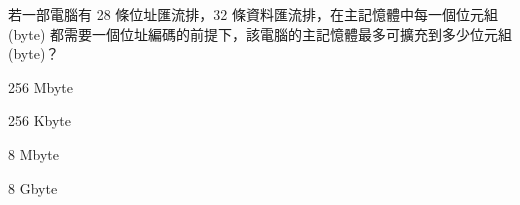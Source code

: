 \ifx\ntpcNinetyThree\undefined[93學年基北區] \fi
若一部電腦有 28 條位址匯流排，32 條資料匯流排，在主記憶體中每一個位元組 (byte) 都需要一個位址編碼的前提下，該電腦的主記憶體最多可擴充到多少位元組 (byte)？
  \begin{optionlist}
  \item 256 Mbyte\label{ntpc-93-a15}
  \item 256 Kbyte
  \item 8 Mbyte
  \item 8 Gbyte
  \end{optionlist}